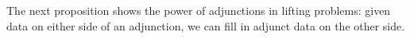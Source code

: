 \documentclass[main.tex]{subfiles}
\begin{document}
The next proposition shows the power of adjunctions in lifting problems: given data on either side of an adjunction, we can fill in adjunct data on the other side.

\end{document}
